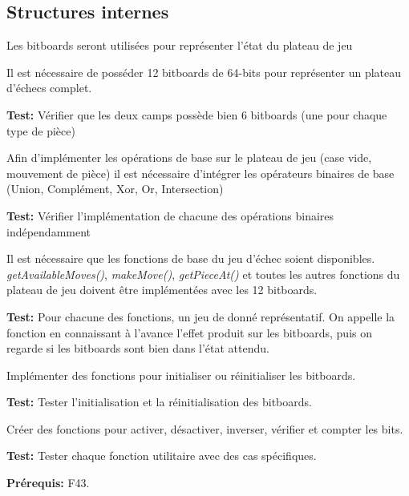 \documentclass{article}
\begin{document}
\subsection{Structures internes}

\begin{needbox}
    Les bitboards seront utilisées pour représenter l'état du plateau de jeu
    \begin{subneedbox}
        Il est nécessaire de posséder 12 bitboards de 64-bits pour représenter un
        plateau d'échecs complet.

        \textbf{Test:} Vérifier que les deux camps possède bien 6 bitboards (une pour chaque type de pièce) 
    \end{subneedbox}
    \begin{subneedbox}
        Afin d'implémenter les opérations de base sur le plateau de jeu (case vide, mouvement de pièce)
        il est nécessaire d'intégrer les opérateurs binaires de base (Union, Complément, Xor, Or, Intersection)

        \textbf{Test:} Vérifier l'implémentation de chacune des opérations binaires indépendamment
    \end{subneedbox}
    \begin{subneedbox}
        Il est nécessaire que les fonctions de base du jeu d'échec soient disponibles.
        \textit{getAvailableMoves()}, \textit{makeMove()}, \textit{getPieceAt()} et toutes 
        les autres fonctions du plateau de jeu doivent être implémentées avec les 12 bitboards.

        \textbf{Test:} Pour chacune des fonctions, un jeu de donné représentatif. On appelle la fonction
        en connaissant à l'avance l'effet produit sur les bitboards, puis on regarde si les bitboards sont
        bien dans l'état attendu.
    \end{subneedbox}
\end{needbox}

\begin{needbox}
    \begin{subneedbox}
        Implémenter des fonctions pour initialiser ou réinitialiser les bitboards.

        \textbf{Test:} Tester l'initialisation et la réinitialisation des bitboards.
    \end{subneedbox}

    \begin{subneedbox}
        Créer des fonctions pour activer, désactiver, inverser, vérifier et compter les bits.

        \textbf{Test:} Tester chaque fonction utilitaire avec des cas spécifiques.
    \end{subneedbox}

    \textbf{Prérequis:} F43.
\end{needbox}
\end{document}
